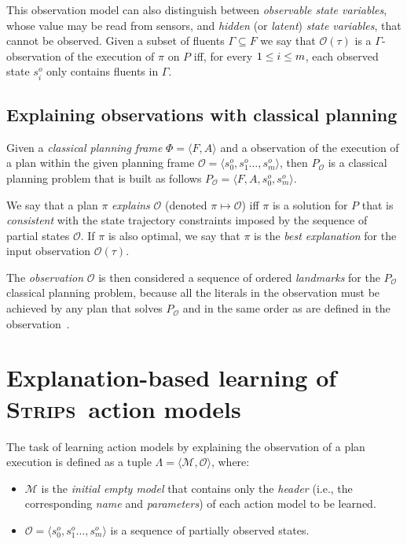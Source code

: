 \documentclass[runningheads]{llncs}
\newcommand{\tup}[1]{{\langle #1 \rangle}}
\newcommand{\strips}{\textsc{Strips}}     %
\begin{document}
This observation model can also distinguish between {\em observable state variables}, whose value may be read from sensors, and {\em hidden} (or {\em latent}) {\em state variables}, that cannot be observed. Given a subset of fluents $\Gamma\subseteq F$ we say that $\mathcal{O}(\tau)$ is a $\Gamma$-observation of the execution of $\pi$ on $P$ iff, for every ${\small 1\leq i\leq m}$, each observed state $s_i^o$ only contains fluents in $\Gamma$.

\subsection{Explaining observations with classical planning}
Given a {\em classical planning frame} $\Phi=\tup{F,A}$ and a observation of the execution of a plan within the given planning frame $\mathcal{O}=\tup{s_0^o,s_1^o \ldots , s_m^o}$, then $P_\mathcal{O}$ is a classical planning problem that is built as follows $P_\mathcal{O}=\tup{F,A,s_0^o,s_m^o}$. 

\begin{definition}[Explanation]
We say that a plan $\pi$ {\em explains} $\mathcal{O}$ (denoted $\pi\mapsto\mathcal{O}$) iff $\pi$ is a solution for $P$ that is {\em consistent} with the state trajectory constraints imposed by the sequence of partial states $\mathcal{O}$. If $\pi$ is also optimal, we say that $\pi$ is the {\em best explanation} for the input observation $\mathcal{O}(\tau)$.
\end{definition}

The {\em observation} $\mathcal{O}$ is then considered a sequence of ordered {\em landmarks} for the $P_\mathcal{O}$ classical planning problem, because all the literals in the observation must be achieved by any plan that solves $P_\mathcal{O}$ and in the same order as are defined in the observation~\cite{hoffmann2004ordered}.


\section{Explanation-based learning of \strips\ action models}
The task of learning action models by explaining the observation of a plan execution is defined as a tuple $\Lambda=\tup{\mathcal{M},{\mathcal O}}$, where:

\begin{itemize}
\item $\mathcal{M}$ is the {\em initial empty model} that contains only the {\em header} (i.e., the corresponding {\em name} and {\em parameters}) of each action model to be learned.
\item $\mathcal{O}=\tup{s_0^o,s_1^o \ldots , s_m^o}$ is a sequence of partially observed states.
\end{itemize}
\end{document}
